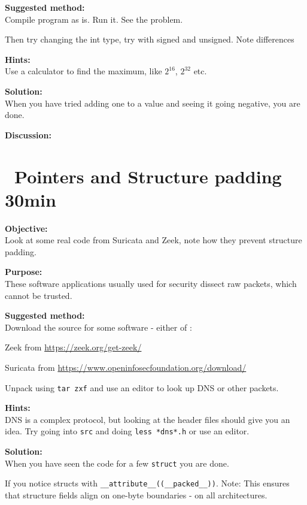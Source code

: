 \documentclass[a4paper,11pt,notitlepage]{report}
\begin{document}
{\bf Suggested method:}\\
Compile program as is. Run it. See the problem.

Then try changing the int type, try with signed and unsigned. Note differences

{\bf Hints:}\\
Use a calculator to find the maximum, like $2^{16}$, $2^{32}$ etc.

{\bf Solution:}\\
When you have tried adding one to a value and seeing it going negative, you are done.

{\bf Discussion:}\\


\chapter{\faExclamationTriangle\ Pointers and Structure padding 30min}
\label{ex:structure-padding}

{\bf Objective:}\\
Look at some real code from Suricata and Zeek, note how they prevent structure padding.

{\bf Purpose:}\\
These software applications usually used for security dissect raw packets, which cannot be trusted.

{\bf Suggested method:}\\
Download the source for some software - either of :
\begin{list2}
\item Zeek from \url{https://zeek.org/get-zeek/}
\item Suricata from \url{https://www.openinfosecfoundation.org/download/}
\end{list2}

Unpack using \verb+tar zxf+ and use an editor to look up DNS or other packets.

{\bf Hints:}\\
DNS is a complex protocol, but looking at the header files should give you an idea. Try going into \verb+src+ and doing \verb+less *dns*.h+ or use an editor.


{\bf Solution:}\\
When you have seen the code for a few \verb+struct+ you are done.

If you notice structs with \verb+__attribute__((__packed__))+. Note: This ensures that structure fields align on one-byte boundaries - on all architectures.
\end{document}
